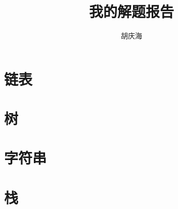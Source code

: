 \documentclass[oneside]{book}
\begin{document}
\begin{CJK}{UTF8}{gbsn}     %

\renewcommand{\contentsname}{目录}
\renewcommand{\figurename}{图}
\renewcommand{\tablename}{表}

\renewcommand{\cftchapfont}{\bfseries}
\renewcommand{\cftchappagefont}{\bfseries}
\renewcommand{\cftchappresnum}{第}
\renewcommand{\cftchapaftersnum}{章:}
\renewcommand{\cftchapnumwidth}{4em}      %

\pagestyle{fancy}
\renewcommand{\chaptermark}[1]{\markboth{\small 第\,\thechapter\,章\quad #1}{}}
\renewcommand{\sectionmark}[1]{\markright{\small\thesection\quad #1}{}}
\fancyhf{}
\fancyhead[ER]{\leftmark}
\fancyhead[OL]{\rightmark}
\fancyhead[EL,OR]{$\cdot$\ \thepage\ $\cdot$}
\renewcommand{\headrulewidth}{0.4pt}

\title{我的解题报告}
\author{胡庆海}
\date{}

\maketitle

\tableofcontents

\chapter{链表}


\chapter{树}


\chapter{字符串}


%

\chapter{栈}



\end{CJK}
\end{document}
